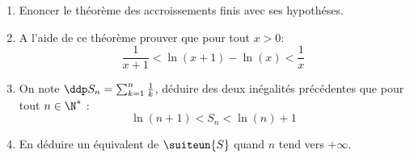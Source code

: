 \documentclass[a4paper, 11pt,reqno]{article}
\begin{document}
\begin{exercice}
\begin{enumerate}
\item Enoncer le théorème des accroissements finis avec ses hypothéses. 
\item A l'aide de ce théorème prouver que pour tout $x>0$:
$$\frac{1}{x+1} <\ln(x+1) -\ln(x) < \frac{1}{x}$$
\item On note $\ddp S_n=\sum_{k=1}^n \frac{1}{k}$, déduire des deux inégalités précédentes  que  pour tout $n\in \N^*$ :
$$\ln(n+1) <S_n  <\ln(n)+1$$
\item En déduire un équivalent de $\suiteun{S}$ quand $n$ tend vers $+\infty$. 



\end{enumerate}
\end{exercice}
\end{document}
